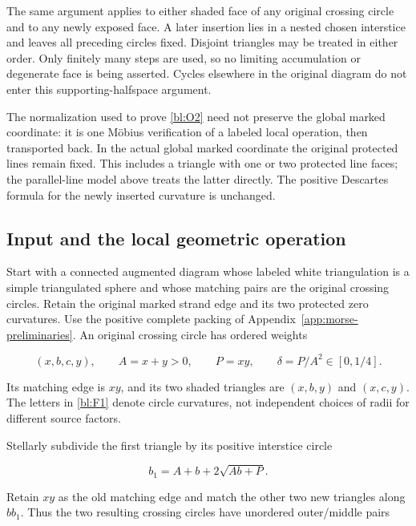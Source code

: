 The same argument applies to either shaded face of any original
crossing circle and to any newly exposed face. A later insertion lies
in a nested chosen interstice and leaves all preceding circles fixed.
Disjoint triangles may be treated in either order. Only finitely many
steps are used, so no limiting accumulation or degenerate face is
being asserted. Cycles elsewhere in the original diagram do not enter
this supporting-halfspace argument.

The normalization used to prove \eqref{bl:O2} need not preserve the global marked
coordinate: it is one Möbius verification of a labeled local operation,
then transported back. In the actual global marked coordinate the
original protected lines remain fixed. This includes a triangle with
one or two protected line faces; the parallel-line model above treats
the latter directly. The positive Descartes formula for the newly
inserted curvature is unchanged.

\subsection{Input and the local geometric operation}\label{bl:input-and-the-local-geometric-operation}

Start with a connected augmented diagram whose labeled white
triangulation is a simple triangulated sphere and whose matching pairs
are the original crossing circles. Retain the original marked strand
edge and its two protected zero curvatures. Use the positive complete packing of Appendix~\ref{app:morse-preliminaries}. An original crossing circle
has ordered weights

\begin{equation}\label{bl:F1}
(x,b,c,y),\qquad A=x+y>0,\qquad P=xy,\qquad
\delta=P/A^2\in[0,1/4].
\end{equation}

Its matching edge is \(xy\), and its two shaded triangles are
\((x,b,y)\) and \((x,c,y)\). The letters in \eqref{bl:F1} denote circle curvatures,
not independent choices of radii for different source factors.

Stellarly subdivide the first triangle by its positive interstice circle

\begin{equation}\label{bl:F2}
b_1=A+b+2\sqrt{Ab+P}.
\end{equation}

Retain \(xy\) as the old matching edge and match the other two new
triangles along \(bb_1\). Thus the two resulting crossing circles have unordered
outer/middle pairs

